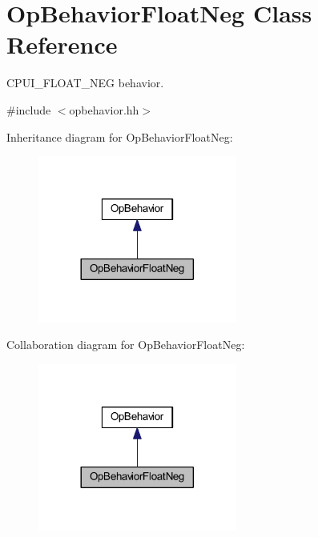 \hypertarget{class_op_behavior_float_neg}{}\section{Op\+Behavior\+Float\+Neg Class Reference}
\label{class_op_behavior_float_neg}


C\+P\+U\+I\+\_\+\+F\+L\+O\+A\+T\+\_\+\+N\+EG behavior.  




{\ttfamily \#include $<$opbehavior.\+hh$>$}



Inheritance diagram for Op\+Behavior\+Float\+Neg\+:
\nopagebreak
\begin{figure}[H]
\begin{center}
\leavevmode
\includegraphics[width=185pt]{class_op_behavior_float_neg__inherit__graph}
\end{center}
\end{figure}


Collaboration diagram for Op\+Behavior\+Float\+Neg\+:
\nopagebreak
\begin{figure}[H]
\begin{center}
\leavevmode
\includegraphics[width=185pt]{class_op_behavior_float_neg__coll__graph}
\end{center}
\end{figure}
